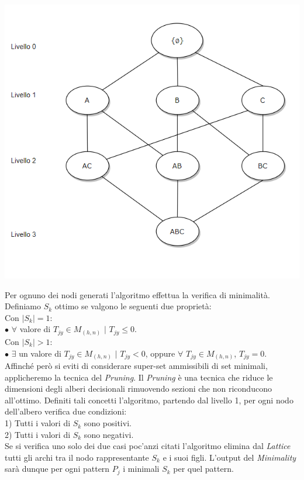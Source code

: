 \begin{center}
	\includegraphics[scale = 0.60]{Immagini/Lattice.png}\\
\end{center}
Per ognuno dei nodi generati l'algoritmo effettua la verifica di minimalità. Definiamo $S_k$ ottimo se valgono le seguenti due proprietà:\\Con $|S_k| = 1$:\\$\bullet$ $\forall$ valore di $T_{jy} \in M_{(h,n)}$ $|$ $T_{jy} \leq 0$.\\Con $|S_k| > 1$:\\ $\bullet$ $\exists$ un valore di $T_{jy} \in M_{(h,n)}$ $|$ $T_{jy} < 0$, oppure $ \forall$  $T_{jy} \in M_{(h,n)}$, $T_{jy}= 0 $.\\ Affinché però si eviti di considerare super-set ammissibili di set minimali, applicheremo la tecnica del \emph{Pruning}. Il \emph{Pruning} è una tecnica che riduce le dimensioni degli alberi decisionali rimuovendo sezioni che non riconducono all'ottimo. Definiti tali concetti l'algoritmo, partendo dal livello 1, per ogni nodo dell'albero verifica due condizioni:\\1) Tutti i valori di $S_k$ sono positivi.\\2) Tutti i valori di $S_k$ sono negativi.\\Se si verifica uno solo dei due casi poc'anzi citati l'algoritmo elimina dal \emph{Lattice} tutti gli archi tra il nodo rappresentante $S_k$ e i suoi figli. L'output del \emph{Minimality} sarà dunque per ogni pattern $P_j$ i minimali $S_k$ per quel pattern.